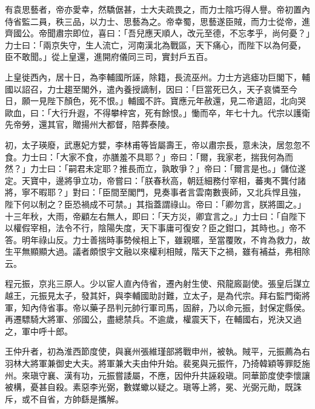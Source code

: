 \begin{pinyinscope}
 有袁思藝者，帝亦愛幸，然驕倨甚，士大夫疏畏之，而力士陰巧得人譽。帝初置內侍省監二員，秩三品，以力士、思藝為之。帝幸蜀，思藝遂臣賊，而力士從帝，進齊國公。帝聞肅宗即位，喜曰：「吾兒應天順人，改元至德，不忘孝乎，尚何憂？」力士曰：「兩京失守，生人流亡，河南漢北為戰區，天下痛心，而陛下以為何憂，臣不敢聞。」從上皇還，進開府儀同三司，實封戶五百。



 上皇徙西內，居十日，為李輔國所誣，除籍，長流巫州。力士方逃瘧功巨閣下，輔國以詔召，力士趨至閣外，遣內養授謫制，因曰：「巨當死已久，天子哀憐至今日，願一見陛下顏色，死不恨。」輔國不許。寶應元年赦還，見二帝遺詔，北向哭歐血，曰：「大行升遐，不得攀梓宮，死有餘恨。」慟而卒，年七十九。代宗以護衛先帝勞，還其官，贈揚州大都督，陪葬泰陵。



 初，太子瑛廢，武惠妃方嬖，李林甫等皆屬壽王，帝以肅宗長，意未決，居忽忽不食。力士曰：「大家不食，亦膳羞不具耶？」帝曰：「爾，我家老，揣我何為而然？」力士曰：「嗣君未定耶？推長而立，孰敢爭？」帝曰：「爾言是也。」儲位遂定。天寶中，邊將爭立功，帝嘗曰：「朕春秋高，朝廷細務付宰相，蕃夷不龔付諸將，寧不暇耶？」對曰：「臣間至閣門，見奏事者言雲南數喪師，又北兵悍且強，陛下何以制之？臣恐禍成不可禁。」其指蓋謂祿山。帝曰：「卿勿言，朕將圖之。」十三年秋，大雨，帝顧左右無人，即曰：「天方災，卿宜言之。」力士曰：「自陛下以權假宰相，法令不行，陰陽失度，天下事庸可復安？臣之鉗口，其時也。」帝不答。明年祿山反。力士善揣時事勢候相上下，雖親暱，至當覆敗，不肯為救力，故生平無顯顯大過。議者頗恨宇文融以來權利相賊，階天下之禍，雖有補益，弗相除云。



 程元振，京兆三原人。少以宦人直內侍省，遷內射生使、飛龍廄副使。張皇后謀立越王，元振見太子，發其奸，與李輔國助討難，立太子，是為代宗。拜右監門衛將軍，知內侍省事。帝以藥子昂判元帥行軍司馬，固辭，乃以命元振，封保定縣侯。再遷驃騎大將軍、邠國公，盡總禁兵。不逾歲，權震天下，在輔國右，兇決又過之，軍中呼十郎。



 王仲升者，初為淮西節度使，與襄州張維瑾部將戰申州，被執。賊平，元振薦為右羽林大將軍兼御史大夫。將軍兼大夫由仲升始。裴冕與元振忤，乃掎韓穎等罪貶施州。來瑱守襄、漢有功，元振嘗諉屬，不應，因仲升共誣殺瑱。同華節度使李懷讓被構，憂甚自殺。素惡李光弼，數媒蠍以疑之。瑱等上將，冕、光弼元勛，既誅斥，或不自省，方帥繇是攜解。




\end{pinyinscope}

